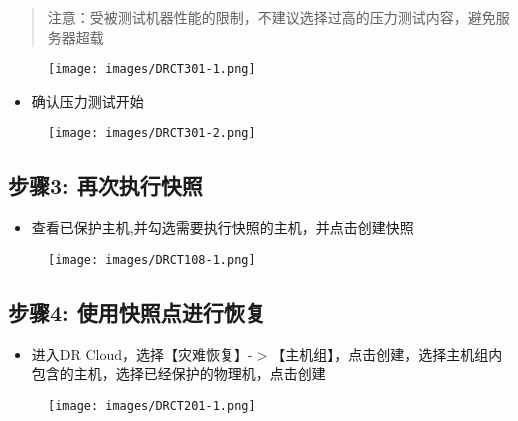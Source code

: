 \begin{quote}

注意：受被测试机器性能的限制，不建议选择过高的压力测试内容，避免服务器超载
\end{quote}

\begin{figure}[htbp]
\centering
\texttt{[image: images/DRCT301-1.png]}
\end{figure}

\begin{itemize}
\item 确认压力测试开始

\end{itemize}

\begin{figure}[htbp]
\centering
\texttt{[image: images/DRCT301-2.png]}
\end{figure}

\subsection{步骤3: 再次执行快照}
\label{步骤3:再次执行快照}

\begin{itemize}
\item 查看已保护主机,并勾选需要执行快照的主机，并点击创建快照

\end{itemize}

\begin{figure}[htbp]
\centering
\texttt{[image: images/DRCT108-1.png]}
\end{figure}

\subsection{步骤4: 使用快照点进行恢复}
\label{步骤4:使用快照点进行恢复}

\begin{itemize}
\item 进入DR Cloud，选择【灾难恢复】-$>$【主机组】，点击创建，选择主机组内包含的主机，选择已经保护的物理机，点击创建

\end{itemize}

\begin{figure}[htbp]
\centering
\texttt{[image: images/DRCT201-1.png]}
\end{figure}

